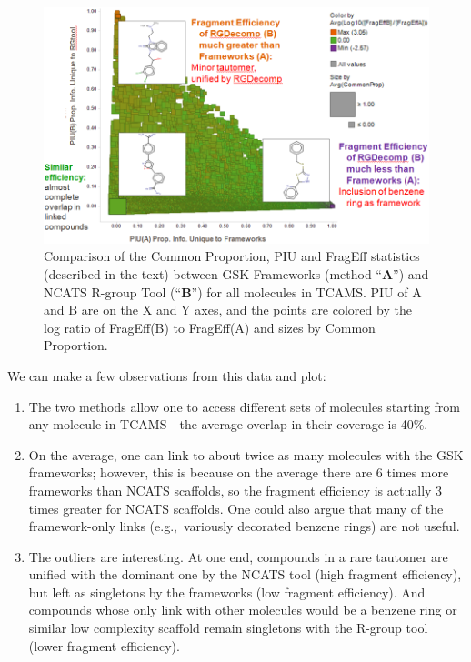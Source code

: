 \documentclass[journal=jacsat,manuscript=article]{achemso}
\newcommand*\eg{e.g.,~}
\begin{document}
\begin{figure}
\includegraphics[width=6in]{fig/statcompare_frames_RGtool.png}
\caption{Comparison of the Common Proportion, PIU and FragEff statistics (described in the text) between GSK Frameworks (method ``{\bf A}'') and NCATS R-group Tool (``{\bf B}'') for all molecules in TCAMS. PIU of A and B are on the X and Y axes, and the points are colored by the log ratio of FragEff(B) to FragEff(A) and sizes by Common Proportion.}
\label{fig:statcompare}
\end{figure}
 
We can make a few observations from this data and plot:
\begin{enumerate} 
\item The two methods allow one to access different sets of molecules starting from any molecule in TCAMS - the average overlap in their coverage is 40\%.
\item On the average, one can link to about twice as many molecules with the GSK frameworks; however, this is because on the average there are 6 times more frameworks than NCATS scaffolds, so the fragment efficiency is actually 3 times greater for NCATS scaffolds. One could also argue that many of the framework-only links (\eg variously decorated benzene rings) are not useful.
\item The outliers are interesting. At one end, compounds in a rare tautomer are unified with the dominant one by the NCATS tool (high fragment efficiency), but left as singletons by the frameworks (low fragment efficiency). And compounds whose only link with other molecules would be a benzene ring or similar low complexity scaffold remain singletons with the R-group tool (lower fragment efficiency).
\end{enumerate}
\end{document}
